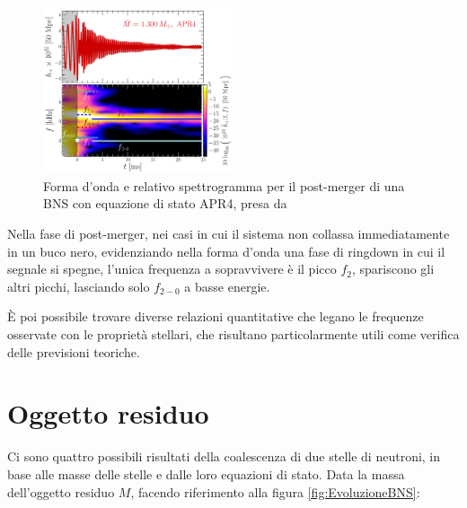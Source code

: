 \begin{figure}
	\vspace{-15pt}
	\begin{center}
		\includegraphics[width=0.5\textwidth]{figures/Capitolo_1/GW_spectrogram_APR4-q10-M1300.pdf}
	\end{center}
	\vspace{-10pt}
	\caption{Forma d'onda e relativo spettrogramma per il post-merger di una BNS con equazione di stato APR4, presa da \cite{Rezzolla_2016}}
	\label{fig:spettrogramma_postmerger_APR4}
	\vspace{-40pt}
\end{figure}

Nella fase di post-merger, nei casi in cui il sistema non collassa immediatamente in un buco nero, evidenziando nella forma d'onda una fase di ringdown in cui il segnale si spegne, l'unica frequenza a sopravvivere è il picco $f_2$, spariscono gli altri picchi, lasciando solo $f_{2-0}$ a basse energie.

È poi possibile trovare diverse relazioni quantitative che legano le frequenze osservate con le proprietà stellari, che risultano particolarmente utili come verifica delle previsioni teoriche.

\section{Oggetto residuo}
\label{section:residual}
Ci sono quattro possibili risultati della coalescenza di due stelle di neutroni, in base alle masse delle stelle e dalle loro equazioni di stato. 
Data la massa dell'oggetto residuo $M$, facendo riferimento alla figura \ref{fig:EvoluzioneBNS}:


